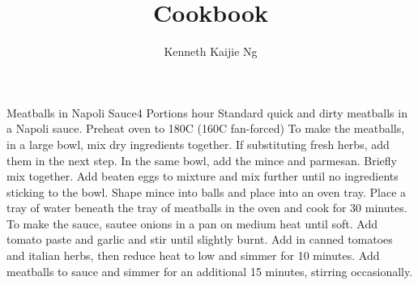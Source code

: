 \documentclass[11pt]{article}
\title{Cookbook}
\author{Kenneth Kaijie Ng}
\date{}
\begin{document}
\maketitle
 
\tableofcontents

\begin{recipe}[Meatballs]{Meatballs in Napoli Sauce}{4 Portions}{ hour}
\freeform Standard quick and dirty meatballs in a Napoli sauce.
\newstep
Preheat oven to 180\0C (160\0C fan-forced)
To make the meatballs, in a large bowl, mix dry ingredients together. If substituting fresh herbs, add them in the next step.
In the same bowl, add the mince and parmesan. Briefly mix together.
Add beaten eggs to mixture and mix further until no ingredients sticking to the bowl.
Shape mince into balls and place into an oven tray. Place a tray of water beneath the tray of meatballs in the oven and cook for 30 minutes.
To make the sauce, sautee onions in a pan on medium heat until soft.
Add tomato paste and garlic and stir until slightly burnt.
Add in canned tomatoes and italian herbs, then reduce heat to low and simmer for 10 minutes.
\newstep
Add meatballs to sauce and simmer for an additional 15 minutes, stirring occasionally.
\freeform\hrulefill
\end{recipe}
\end{document}
